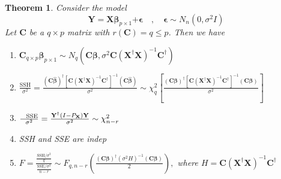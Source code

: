 \documentclass{article}
\newtheorem{theorem}{Theorem}
\begin{document}
\begin{theorem}
Consider the model%
\begin{equation*}
\mathbf{Y=X\beta }_{p\times 1}\mathbf{+\epsilon \quad ,\quad \epsilon }\sim
N_{n}\left( 0,\sigma ^{2}I\right)
\end{equation*}%
Let $\mathbf{C}$ be a $q\times p$ matrix with $r\left( \mathbf{C}\right)
=q\leq p$. Then we have

\begin{enumerate}
\item $\mathbf{C}_{q\times p}\mathbf{\hat{\beta}}_{p\times 1}\sim
N_{q}\left( \mathbf{C\beta },\sigma ^{2}\mathbf{C}\left( \mathbf{X}^{\dagger
}\mathbf{X}\right) ^{-1}\mathbf{C}^{\dagger }\right) $

\item $\frac{\text{SSH}}{\sigma ^{2}}=\frac{\left( \mathbf{C\hat{\beta}}%
\right) ^{\dagger }\left[ \mathbf{C}\left( \mathbf{X}^{\dagger }\mathbf{X}%
\right) ^{-1}\mathbf{C}^{\dagger }\right] ^{-1}\left( \mathbf{C\hat{\beta}}%
\right) }{\sigma ^{2}}\sim \chi _{q}^{2}\left[ \frac{\left( \mathbf{C\beta }%
\right) ^{\dagger }\left[ \mathbf{C}\left( \mathbf{X}^{\dagger }\mathbf{X}%
\right) ^{-1}\mathbf{C}^{\dagger }\right] ^{-1}\left( \mathbf{C\beta }%
\right) }{\sigma ^{2}}\right] $

\item $\frac{\text{SSE}}{\sigma ^{2}}=\frac{\mathbf{Y}^{\dagger }\left( I-P_{%
\mathbf{X}}\right) \mathbf{Y}}{\sigma ^{2}}\sim \chi _{n-r}^{2}$

\item SSH and SSE are indep

\item $F=\frac{\frac{\text{SSH}/\sigma ^{2}}{q}}{\frac{\text{SSE}/\sigma ^{2}%
}{n-r}}\sim F_{q,n-r}\left( \frac{\left( \mathbf{C\beta }\right) ^{\dagger
}\left( \sigma ^{2}H\right) ^{-1}\left( \mathbf{C\beta }\right) }{2}\right) ,
$ where $H=\mathbf{C}\left( \mathbf{X}^{\dagger }\mathbf{X}\right) ^{-1}%
\mathbf{C}^{\dagger }$
\end{enumerate}
\end{theorem}

\bigskip 
\end{document}
